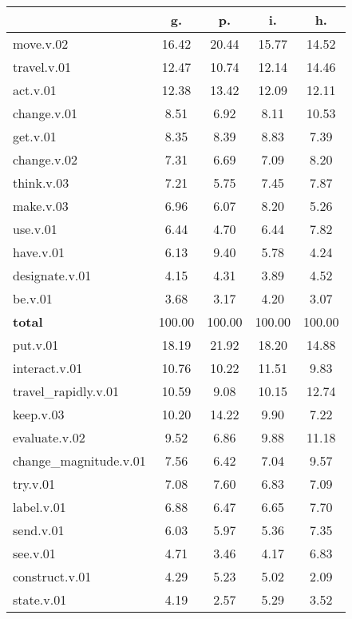 \begin{table}[h!]
\begin{center}
\begin{tabular}{| l || c | c | c | c |}\hline
 & {\bf g.} & {\bf p.} & {\bf i.} & {\bf h.} \\\hline\hline
move.v.02 & 16.42  & 20.44  & 15.77  & 14.52 \\\hline
travel.v.01 & 12.47  & 10.74  & 12.14  & 14.46 \\\hline
act.v.01 & 12.38  & 13.42  & 12.09  & 12.11 \\\hline
change.v.01 & 8.51  & 6.92  & 8.11  & 10.53 \\\hline
get.v.01 & 8.35  & 8.39  & 8.83  & 7.39 \\\hline
change.v.02 & 7.31  & 6.69  & 7.09  & 8.20 \\\hline
think.v.03 & 7.21  & 5.75  & 7.45  & 7.87 \\\hline
make.v.03 & 6.96  & 6.07  & 8.20  & 5.26 \\\hline
use.v.01 & 6.44  & 4.70  & 6.44  & 7.82 \\\hline
have.v.01 & 6.13  & 9.40  & 5.78  & 4.24 \\\hline
designate.v.01 & 4.15  & 4.31  & 3.89  & 4.52 \\\hline
be.v.01 & 3.68  & 3.17  & 4.20  & 3.07 \\\hline\hline
{{\bf total}} & 100.00  & 100.00  & 100.00  & 100.00 \\\hline\hline\hline
put.v.01 & 18.19  & 21.92  & 18.20  & 14.88 \\\hline
interact.v.01 & 10.76  & 10.22  & 11.51  & 9.83 \\\hline
travel\_rapidly.v.01 & 10.59  & 9.08  & 10.15  & 12.74 \\\hline
keep.v.03 & 10.20  & 14.22  & 9.90  & 7.22 \\\hline
evaluate.v.02 & 9.52  & 6.86  & 9.88  & 11.18 \\\hline
change\_magnitude.v.01 & 7.56  & 6.42  & 7.04  & 9.57 \\\hline
try.v.01 & 7.08  & 7.60  & 6.83  & 7.09 \\\hline
label.v.01 & 6.88  & 6.47  & 6.65  & 7.70 \\\hline
send.v.01 & 6.03  & 5.97  & 5.36  & 7.35 \\\hline
see.v.01 & 4.71  & 3.46  & 4.17  & 6.83 \\\hline
construct.v.01 & 4.29  & 5.23  & 5.02  & 2.09 \\\hline
state.v.01 & 4.19  & 2.57  & 5.29  & 3.52 \\\hline\hline

\end{tabular}
\end{center}
\end{table}
